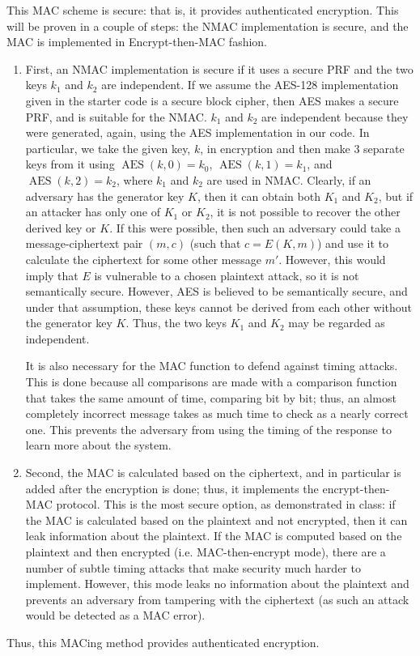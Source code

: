 \documentclass{amsart}
\DeclareMathOperator{\AES}{AES}
\begin{document}
This MAC scheme is secure: that is, it provides authenticated encryption. This will be proven in a couple of steps: the NMAC implementation is secure, and the MAC is implemented in Encrypt-then-MAC fashion.
\begin{enumerate}
  \item First, an NMAC implementation is secure if it uses a secure PRF and the two keys $k_1$ and $k_2$ are independent. If we assume the AES-128 implementation given in the starter code is a secure block cipher, then AES makes a secure PRF, and is suitable for the NMAC. $k_1$ and $k_2$ are independent because they were generated, again, using the AES implementation in our code. In particular, we take the given key, $k$, in encryption and then make 3 separate keys from it using $\AES(k, 0) = k_0$, $\AES(k, 1) = k_1$, and $\AES(k, 2) = k_2$, where $k_1$ and $k_2$ are used in NMAC. Clearly, if an adversary has the generator key $K$, then it can obtain both $K_1$ and $K_2$, but if an attacker has only one of $K_1$ or $K_2$, it is not possible to recover the other derived key or $K$. If this were possible, then such an adversary could take a message-ciphertext pair $(m,c)$ (such that $c = E(K,m)$) and use it to calculate the ciphertext for some other message $m'$. However, this would imply that $E$ is vulnerable to a chosen plaintext attack, so it is not semantically secure. However, AES is believed to be semantically secure, and under that assumption, these keys cannot be derived from each other without the generator key $K$. Thus, the two keys $K_1$ and $K_2$ may be regarded as independent.
    
    It is also necessary for the MAC function to defend against timing attacks. This is done because all comparisons are made with a comparison function that takes the same amount of time, comparing bit by bit; thus, an almost completely incorrect message takes as much time to check as a nearly correct one. This prevents the adversary from using the timing of the response to learn more about the system.

  \item Second, the MAC is calculated based on the ciphertext, and in particular is added after the encryption is done; thus, it implements the encrypt-then-MAC protocol. This is the most secure option, as demonstrated in class: if the MAC is calculated based on the plaintext and not encrypted, then it can leak information about the plaintext. If the MAC is computed based on the plaintext and then encrypted (i.e. MAC-then-encrypt mode), there are a number of subtle timing attacks that make security much harder to implement. However, this mode leaks no information about the plaintext and prevents an adversary from tampering with the ciphertext (as such an attack would be detected as a MAC error).
\end{enumerate}
Thus, this MACing method provides authenticated encryption.
\end{document}
